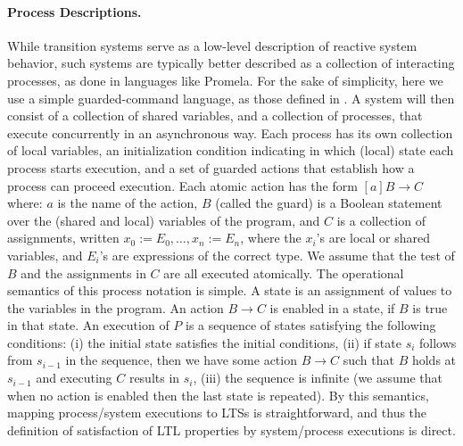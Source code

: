 \paragraph{Process Descriptions.}
\label{sec:programming-language} 
While transition systems serve as a low-level description of reactive system behavior, such systems are typically better described as a collection of interacting processes,  as done in languages like Promela.  For the sake of simplicity,  here we use a  simple guarded-command language, as those defined in  \cite{Dijkstra1975,AroraGouda93}.  A system will then consist of a collection of shared variables, and a collection of processes, that execute concurrently in an asynchronous way. Each process has its own collection of local variables, an initialization condition indicating in which (local) state each process starts execution, and a set of guarded actions that establish how a process can proceed execution. Each atomic action has the form $[a]B \rightarrow C$ where: $a$ is the name of the action,  $B$ (called the guard) is a Boolean statement over the (shared and local) variables of the program, and $C$ is a collection of assignments, written $x_0{:=}E_0, \dots, x_n{:=}E_n$, where the $x_i$'s  are local or shared variables, and $E_i$'s are expressions of the correct type. We assume that the test of $B$ and the assignments in $C$ are all executed atomically. The operational semantics of this process notation is simple. A state is an assignment of values to the variables in the program. An action $B \rightarrow C$ is enabled in a state, if $B$ is true in that state. An execution of $P$ is a sequence of states satisfying the following conditions: (i) the initial state satisfies the initial conditions, (ii) if state $s_i$ follows from $s_{i-1}$ in the sequence, then we have some action $B \rightarrow C$ such that $B$ holds at $s_{i-1}$ and executing $C$ results in $s_i$, (iii) the sequence is infinite (we assume that when no action is enabled then the last state is repeated). By this semantics, mapping process/system executions to LTSs is straightforward, and thus the definition of satisfaction of LTL properties by system/process executions is direct. 
